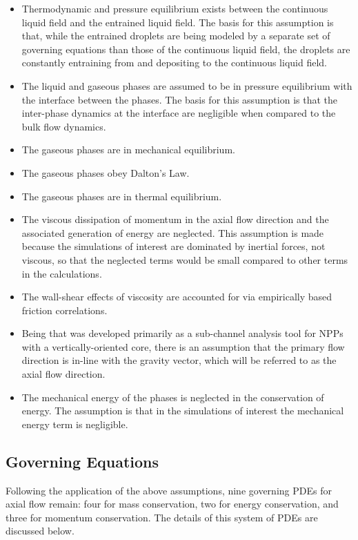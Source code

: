 \begin{itemize}
\item{
Thermodynamic and pressure equilibrium exists between the continuous liquid field and the entrained liquid field.
The basis for this assumption is that, while the entrained droplets are being modeled by a separate set of governing equations than those of the continuous liquid field, the droplets are constantly entraining from and depositing to the continuous liquid field. 
}
\item{
The liquid and gaseous phases are assumed to be in pressure equilibrium with the interface between the phases.
The basis for this assumption is that the inter-phase dynamics at the interface are negligible when compared to the bulk flow dynamics.
}
\item{The gaseous phases are in mechanical equilibrium.}
\item{The gaseous phases obey Dalton's Law.}
\item{The gaseous phases are in thermal equilibrium.}
\item{
The viscous dissipation of momentum in the axial flow direction and the associated generation of energy are neglected.
This assumption is made because the simulations of interest are dominated by inertial forces, not viscous, so that the neglected terms would be small compared to other terms in the calculations.
}
\item{
The wall-shear effects of viscosity are accounted for via empirically based friction correlations.
}
\item{
Being that \cobra{} was developed primarily as a sub-channel analysis tool for NPPs with a vertically-oriented core, there is an assumption that the primary flow direction is in-line with the gravity vector, which will be referred to as the axial flow direction.}
\item{
The mechanical energy of the phases is neglected in the conservation of energy. 
The assumption is that in the simulations of interest the mechanical energy term is negligible.
}
\end{itemize}

\subsection{Governing Equations}
\label{subsect:governing_equations}

Following the application of the above assumptions, nine governing PDEs for axial flow remain: four for mass conservation, two for energy conservation, and three for momentum conservation.
The details of this system of PDEs are discussed below.


